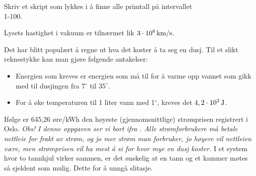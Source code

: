 \newpage
{}
Skriv et skript som lykkes i å finne alle primtall på intervallet\\ 1-100.

Lysets hastighet i vakuum er tilnærmet lik $ 3\cdot10^8\,\textrm{km/s} $.


Det har blitt populært å regne ut hva det koster å ta seg en dusj. Til et slikt reknestykke kan man gjøre følgende antakelser:
\begin{itemize}
	\item Energien som kreves er energien som må til for å varme opp vannet som gikk med til dusjingen fra 7$^\circ $ til $ 35^\circ $.
	\item For å øke temperaturen til 1 liter vann med 1$ ^\circ $, kreves det $ 4,2\cdot10^3\,\textrm{J} $.
\end{itemize}
Ifølge  er 645,26 øre/kWh den høyeste (gjennomsnittlige) strømprisen registrert i Oslo. 
\textit{\small Obs! I denne oppgaven ser vi bort ifra . Alle strømforbrukere må betale nettleie for frakt av strøm, og jo mer strøm man forbruker, jo høyere vil nettleien være, men strømprisen vil ha mest å si for hvor mye en dusj koster.}
\newpage
{}
I et system hvor to tannhjul virker sammen, er det ønskelig at en tann og et kammer møtes så sjeldent som mulig. Dette for å unngå slitasje. \vsk

